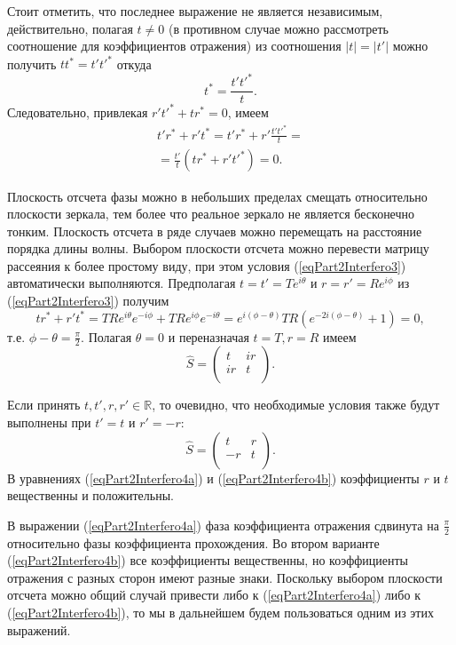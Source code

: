 Стоит отметить, что последнее выражение не является независимым,
действительно, полагая $t \ne 0$ (в противном случае можно рассмотреть
соотношение для коэффициентов отражения)
из соотношения $\left|t\right| = \left|t'\right|$ можно получить
\(
t t^\ast = t' t'^\ast
\)
откуда
\[
t^\ast = \frac{t' t'^\ast}{t}.
\]
Следовательно, привлекая $r' t'^\ast + t r^\ast = 0$, имеем
\begin{eqnarray}
  t' r^\ast + r' t^\ast =
  t' r^\ast + r' \frac{t' t'^\ast}{t} =
  \nonumber \\
  = \frac{t'}{t}\left(t r^\ast + r't'^\ast\right) = 0.
  \nonumber
\end{eqnarray}

Плоскость отсчета фазы можно в небольших пределах смещать относительно
плоскости зеркала, тем более что реальное зеркало не является
бесконечно тонким. Плоскость отсчета в ряде случаев можно перемещать
на расстояние порядка длины волны. Выбором плоскости отсчета можно
перевести матрицу рассеяния к более простому виду, при этом условия 
(\ref{eqPart2Interfero3}) автоматически выполняются.
Предполагая $t = t' = T e^{i \theta}$ и $r = r' = R e^{i \phi}$ из
(\ref{eqPart2Interfero3}) получим
\[
t r^\ast + r' t^\ast = TR e^{ i \theta} e^{- i \phi} + TR e^{ i \phi}
e^{- i \theta} =
e^{i (\phi-\theta)} TR \left(e^{-2 i (\phi-\theta)} + 1\right) = 0,
\]
т.е. $\phi - \theta = \frac{\pi}{2}$. Полагая $\theta = 0$ и
переназначая $t = T, r = R$ имеем
\begin{equation}
\hat{S} = \left(
\begin{array}{cc}
t & i r \\
i r & t \\
\end{array}
\right).
\label{eqPart2Interfero4a}
\end{equation}

Если принять $t,t',r,r' \in \mathbb{R}$, то очевидно, что необходимые
условия также будут выполнены при $t' = t$ и $r' = -r$:
\begin{equation}
\hat{S} = \left(
\begin{array}{cc}
t & r \\
-r & t \\
\end{array}
\right).
\label{eqPart2Interfero4b}
\end{equation}
В уравнениях (\ref{eqPart2Interfero4a}) и (\ref{eqPart2Interfero4b})
коэффициенты $r$ и $t$ вещественны и положительны.

В выражении (\ref{eqPart2Interfero4a}) фаза коэффициента отражения
сдвинута на $\frac{\pi}{2}$ относительно фазы коэффициента
прохождения. Во втором варианте (\ref{eqPart2Interfero4b}) все
коэффициенты вещественны, но коэффициенты отражения с разных сторон
имеют разные знаки. Поскольку выбором плоскости отсчета можно общий
случай привести либо к  (\ref{eqPart2Interfero4a}) либо к
(\ref{eqPart2Interfero4b}), то мы в дальнейшем будем пользоваться
одним из этих выражений.

